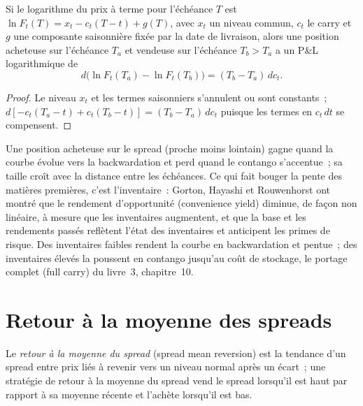 \begin{proposition}\label{prop:s1:calendar-spreads-and-curve-trades:carry}
Si le logarithme du prix à terme pour l'échéance $T$ est $\ln F_t(T) = x_t - c_t (T - t) + g(T)$, avec $x_t$ un niveau commun, $c_t$ le carry et $g$ une
composante saisonnière fixée par la date de livraison, alors une position acheteuse sur l'échéance $T_a$ et vendeuse sur l'échéance $T_b > T_a$ a un P\&L logarithmique de
\[
d\big(\ln F_t(T_a) - \ln F_t(T_b)\big) = (T_b - T_a)\, dc_t .
\]
\end{proposition}
\begin{proof}
Le niveau $x_t$ et les termes saisonniers s'annulent ou sont constants~; $d[-c_t(T_a - t) + c_t(T_b - t)] = (T_b - T_a)\,dc_t$ puisque les termes en $c_t\,dt$
se compensent.
\end{proof}

Une position acheteuse sur le spread (proche moins lointain) gagne quand la courbe évolue vers la backwardation et perd quand le contango s'accentue~; sa taille croît avec la distance
entre les échéances. Ce qui fait bouger la pente des matières premières, c'est l'inventaire~: Gorton, Hayashi et Rouwenhorst ont montré que le rendement d'opportunité (convenience yield) diminue, de façon non linéaire,
à mesure que les inventaires augmentent, et que la base et les rendements passés reflètent l'état des inventaires et anticipent les primes de risque. Des inventaires faibles rendent la
courbe en backwardation et pentue~; des inventaires élevés la poussent en contango jusqu'au coût de stockage, le portage complet (full carry) du livre~3, chapitre~10.

\section{Retour à la moyenne des spreads}

\begin{definition}\label{def:s1:calendar-spreads-and-curve-trades:mr}
Le \emph{retour à la moyenne du spread} (spread mean reversion) est la tendance d'un spread entre prix liés à revenir vers un niveau normal après
un écart~; une stratégie de retour à la moyenne du spread vend le spread lorsqu'il est haut par rapport à sa moyenne récente et l'achète lorsqu'il est bas.
\end{definition}


